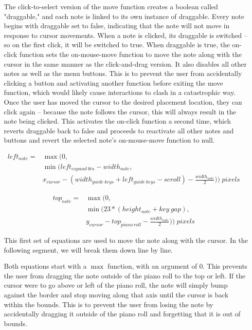 The click-to-select version of the move function creates a boolean called "draggable," and each
note is linked to its own instance of draggable. Every note begins with draggable set to false,
indicating that the note will not move in response to cursor movements. When a note is clicked, its
draggable is switched – so on the first click, it will be switched to true. When draggable is true,
the on-click function sets the on-mouse-move function to move the note along with the cursor in the
same manner as the click-and-drag version. It also disables all other notes as well as the menu
buttons. This is to prevent the user from accidentally clicking a button and activating another
function before exiting the move function, which would likely cause interactions to clash in a
catastrophic way. Once the user has moved the cursor to the desired placement location, they can
click again – because the note follows the cursor, this will always result in the note being
clicked. This activates the on-click function a second time, which reverts draggable back to false
and proceeds to reactivate all other notes and buttons and revert the selected note’s on-mouse-move
function to null.

\begin{align} \label{move_horz}
  left_{note} = &\max(0,                                                                                               \\
                & \min(left_{expand\:btn} - width_{note},                                                              \\
                & x_{cursor} - (width_{guide\:keys} + left_{guide\:keys} - scroll) - \frac{width_{note}}{2})) \;pixels &
\end{align}

\begin{align} \label{move_vert}
  top_{note} = &\max(0,                                                             \\
               & \min(23 * (height_{note} + key\:gap),                              \\
               & y_{cursor} - top_{piano\:roll} - \frac{width_{note}}{2})) \;pixels &
\end{align}

This first set of equations are used to move the note along with the cursor. In the following
segment, we will break them down line by line.

Both equations start with a $ \max $ function, with an argument of $ 0 $. This prevents the user from
dragging the note outside of the piano roll to the top or left. If the cursor were to go above or
left of the piano roll, the note will simply bump against the border and stop moving along that
axis until the cursor is back within the bounds. This is to prevent the user from losing the note
by accidentally dragging it outside of the piano roll and forgetting that it is out of bounds.

